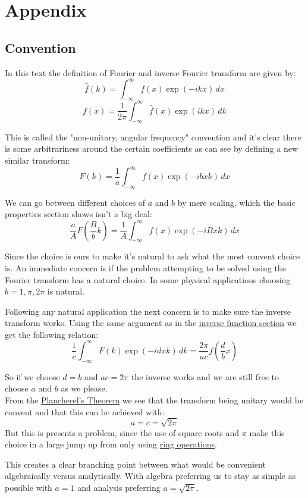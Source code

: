 \chapter{Appendix}

\section{Convention}
In this text the definition of Fourier and inverse Fourier transform are given by:
\[\hat{f}(k) = \int_{-\infty}^{\infty}f(x)\exp(-ikx)\,dx\]
\[f(x) =\frac{1}{2\pi} \int_{-\infty}^{\infty}\hat{f}(x)\exp(ikx)\,dk\]

This is called the "non-unitary, angular frequency" convention and it's clear there is some arbitrariness around the certain coefficients as can see by defining a new similar transform:
\[F(k) = \frac{1}{a}\int_{-\infty}^{\infty}f(x)\exp(-ibxk)\,dx\]

We can go between different choices of $a$ and $b$ by mere scaling, which the basic properties section shows isn't a big deal:
\[\frac{a}{A}F\left(\frac{B}{b}k\right) = \frac{1}{A}\int_{-\infty}^{\infty}f(x)\exp(-iBxk)\,dx\]

Since the choice is ours to make it's natural to ask what the most convent choice is.
An immediate concern is if the problem attempting to be solved using the Fourier transform has a natural choice.
In some physical applications choosing $b= 1,\pi,2\pi$ is natural.

Following any natural application the next concern is to make sure the inverse transform works.
Using the same argument as in the \hyperref[sec:inv-trans]{inverse function section} we get the following relation:
\[\frac{1}{c}\int_{-\infty}^{\infty}F(k)\exp(-idxk)\,dk = \frac{2\pi}{ac}f\left(\frac{d}{b}x\right)\]

So if we choose $d=b$ and $ac = 2\pi$ the inverse works and we are still free to choose $a$ and $b$ as we please.
\\

From the \hyperref[sec:plancherel]{Plancherel's Theorem} we see that the transform being unitary would be convent and that this can be achieved with:
\[a = c = \sqrt{2\pi}\]
But this is presents a problem, since the use of square roots and $\pi$ make this choice in a large jump up from only using \hyperref[sec:ring]{ring operations}.

This creates a clear branching point between what would be convenient algebraically versus analytically.
With algebra preferring us to stay as simple as possible with $a=1$ and analysis preferring $a=\sqrt{2\pi}$.
\\

